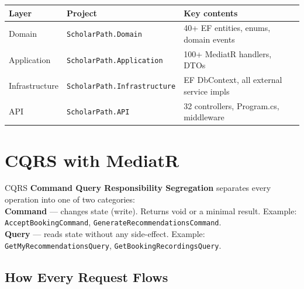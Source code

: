 \documentclass[11pt,a4paper]{article}
\begin{document}
\begin{center}
\begin{tabular}{lll}
\toprule
\textbf{Layer} & \textbf{Project} & \textbf{Key contents}\\
\midrule
Domain & \texttt{ScholarPath.Domain} & 40+ EF entities, enums, domain events\\
Application & \texttt{ScholarPath.Application} & 100+ MediatR handlers, DTOs\\
Infrastructure & \texttt{ScholarPath.Infrastructure} & EF DbContext, all external service impls\\
API & \texttt{ScholarPath.API} & 32 controllers, Program.cs, middleware\\
\bottomrule
\end{tabular}
\end{center}

\section{CQRS with MediatR}

\begin{conceptbox}{CQRS}
\textbf{Command Query Responsibility Segregation} separates every operation
into one of two categories:\\[3pt]
\textbf{Command} --- changes state (write). Returns void or a minimal result.
Example: \texttt{AcceptBookingCommand}, \texttt{GenerateRecommendationsCommand}.\\[3pt]
\textbf{Query} --- reads state without any side-effect.
Example: \texttt{GetMyRecommendationsQuery}, \texttt{GetBookingRecordingsQuery}.
\end{conceptbox}

\subsection{How Every Request Flows}
\end{document}
